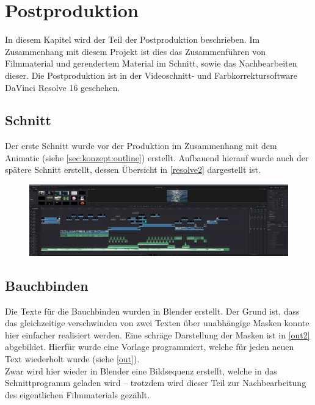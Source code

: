 \chapter{Postproduktion}

In diesem Kapitel wird der Teil der Postproduktion beschrieben. Im Zusammenhang mit diesem Projekt ist dies das Zusammenführen von Filmmaterial und gerendertem Material im Schnitt, sowie das Nachbearbeiten dieser. Die Postproduktion ist in der Videoschnitt- und Farbkorrektursoftware DaVinci Resolve 16 geschehen.

\section{Schnitt}

Der erste Schnitt wurde vor der Produktion im Zusammenhang mit dem Animatic (siehe \autoref{sec:konzept:outline}) erstellt. Aufbauend hierauf wurde auch der spätere Schnitt erstellt, dessen Übersicht in \autoref{resolve2} dargestellt ist.

\begin{figure}[H]
\begin{center}
\includegraphics[width=\textwidth]{gfx/post/resolve2.jpg}
\caption{}
\label{resolve2}
\end{center}
\end{figure}

\section{Bauchbinden}
\label{sec:bauchbinden}

Die Texte für die Bauchbinden wurden in Blender erstellt. Der Grund ist, dass das gleichzeitige verschwinden von zwei Texten über unabhängige Masken konnte hier einfacher realisiert werden. Eine schräge Darstellung der Masken ist in \autoref{out2} abgebildet. Hierfür wurde eine Vorlage programmiert, welche für jeden neuen Text wiederholt wurde (siehe \autoref{out}).\\
Zwar wird hier wieder in Blender eine Bildsequenz erstellt, welche in das Schnittprogramm geladen wird -- trotzdem wird dieser Teil zur Nachbearbeitung des eigentlichen Filmmaterials gezählt.

